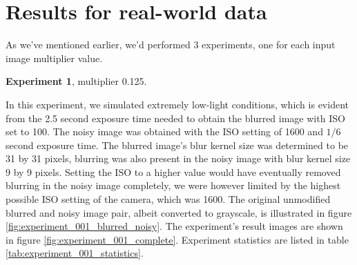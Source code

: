 \documentclass[12pt,notitlepage]{report}
\begin{document}
\clearpage

\section{Results for real-world data}
\label{sec:real_world_data}

As we've mentioned earlier, we'd performed 3 experiments, one for each input image multiplier value.   

\noindent \textbf{Experiment 1}, multiplier 0.125.

In this experiment, we simulated extremely low-light conditions, which is evident from the 2.5 second exposure time needed to obtain the blurred image with ISO set to 100. The noisy image was obtained with the ISO setting of 1600 and $1/6$ second exposure time. The blurred image's blur kernel size was determined to be 31 by 31 pixels, blurring was also present in the noisy image with blur kernel size 9 by 9 pixels. Setting the ISO to a higher value would have eventually removed blurring in the noisy image completely, we were however limited by the highest possible ISO setting of the camera, which was 1600. The original unmodified blurred and noisy image pair, albeit converted to grayscale, is illustrated in figure \ref{fig:experiment_001_blurred_noisy}. The experiment's result images are shown in figure \ref{fig:experiment_001_complete}. Experiment statistics are listed in table \ref{tab:experiment_001_statistics}. 

\end{document}
